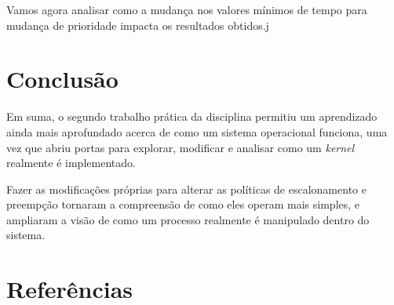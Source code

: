 \documentclass{article}
\begin{document}
Vamos agora analisar como a mudança nos valores mínimos de tempo para mudança
de prioridade impacta os resultados obtidos.j

\section{Conclusão}

Em suma, o segundo trabalho prática da disciplina
permitiu um aprendizado ainda mais aprofundado acerca de como um sistema
operacional funciona, uma vez que abriu portas para explorar, modificar e
analisar como um \textit{kernel} realmente é implementado.

Fazer as modificações próprias para alterar as políticas de escalonamento e
preempção tornaram a compreensão de como eles operam mais simples, e ampliaram
a visão de como um processo realmente é manipulado dentro do sistema.

\section{Referências}
\end{document}

